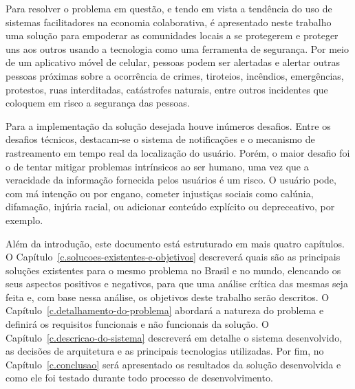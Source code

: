 Para resolver o problema em questão, e tendo em vista a tendência do uso de sistemas facilitadores na economia colaborativa, é apresentado neste trabalho uma solução para empoderar as comunidades locais a se protegerem e proteger uns aos outros usando a tecnologia como uma ferramenta de segurança. Por meio de um aplicativo móvel de celular, pessoas podem ser alertadas e alertar outras pessoas próximas sobre a ocorrência de crimes, tiroteios, incêndios, emergências, protestos, ruas interditadas, catástrofes naturais, entre outros incidentes que coloquem em risco a segurança das pessoas.


Para a implementação da solução desejada houve inúmeros desafios. Entre os desafios técnicos, destacam-se o sistema de notificações e o mecanismo de rastreamento em tempo real da localização do usuário. Porém, o maior desafio foi o de tentar mitigar problemas intrínsicos ao ser humano, uma vez que a veracidade da informação fornecida pelos usuários é um risco. O usuário pode, com má intenção ou por engano, cometer injustiças sociais como calúnia, difamação, injúria racial, ou adicionar conteúdo explícito ou depreceativo, por exemplo.

Além da introdução, este documento está estruturado em mais quatro capítulos. O Capítulo~\ref{c.solucoes-existentes-e-objetivos} descreverá quais são as principais soluções existentes para o mesmo problema no Brasil e no mundo, elencando os seus aspectos positivos e negativos, para que uma análise crítica das mesmas seja feita e, com base nessa análise, os objetivos deste trabalho serão descritos. O Capítulo~\ref{c.detalhamento-do-problema} abordará a natureza do problema e definirá os requisitos funcionais e não funcionais da solução. O Capítulo~\ref{c.descricao-do-sistema} descreverá em detalhe o sistema desenvolvido, as decisões de arquitetura e as principais tecnologias utilizadas. Por fim, no Capítulo~\ref{c.conclusao} será apresentado os resultados da solução desenvolvida e como ele foi testado durante todo processo de desenvolvimento.
